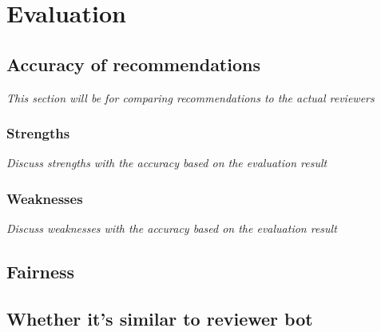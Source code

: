 \chapter{Evaluation\label{chap:evaluation}}

\section{Accuracy of recommendations}
\em{This section will be for comparing recommendations to the actual reviewers}

\subsection{Strengths}
\em{Discuss strengths with the accuracy based on the evaluation result}

\subsection{Weaknesses}
\em{Discuss weaknesses with the accuracy based on the evaluation result}

\section{Fairness}

\section{Whether it's similar to reviewer bot}